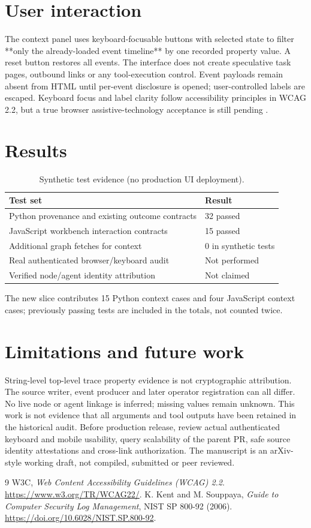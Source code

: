 \documentclass[11pt]{article}
\begin{document}
\section{User interaction}
The context panel uses keyboard-focusable buttons with selected state to filter **only the already-loaded event timeline** by one recorded property value. A reset button restores all events. The interface does not create speculative task pages, outbound links or any tool-execution control. Event payloads remain absent from HTML until per-event disclosure is opened; user-controlled labels are escaped. Keyboard focus and label clarity follow accessibility principles in WCAG 2.2, but a true browser assistive-technology acceptance is still pending \cite{wcag22}.
\section{Results}
\begin{table}[h]\centering
\caption{Synthetic test evidence (no production UI deployment).}
\begin{tabular}{ll}\toprule
Test set & Result\\\midrule
Python provenance and existing outcome contracts & 32 passed\\
JavaScript workbench interaction contracts & 15 passed\\
Additional graph fetches for context & 0 in synthetic tests\\
Real authenticated browser/keyboard audit & Not performed\\
Verified node/agent identity attribution & Not claimed\\
\bottomrule
\end{tabular}\end{table}
The new slice contributes 15 Python context cases and four JavaScript context cases; previously passing tests are included in the totals, not counted twice.
\section{Limitations and future work}
String-level top-level trace property evidence is not cryptographic attribution. The source writer, event producer and later operator registration can all differ. No live node or agent linkage is inferred; missing values remain unknown. This work is not evidence that all arguments and tool outputs have been retained in the historical audit. Before production release, review actual authenticated keyboard and mobile usability, query scalability of the parent PR, safe source identity attestations and cross-link authorization. The manuscript is an arXiv-style working draft, not compiled, submitted or peer reviewed.
\begin{thebibliography}{9}
 W3C, \emph{Web Content Accessibility Guidelines (WCAG) 2.2}. \url{https://www.w3.org/TR/WCAG22/}.
 K. Kent and M. Souppaya, \emph{Guide to Computer Security Log Management}, NIST SP 800-92 (2006). \url{https://doi.org/10.6028/NIST.SP.800-92}.
\end{thebibliography}
\end{document}
